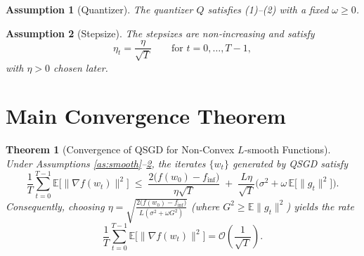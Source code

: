 \documentclass{article}
\newtheorem{theorem}{Theorem}
\newtheorem{assumption}{Assumption}
\newcommand{\EE}{\mathbb{E}}
\begin{document}
\begin{assumption}[Quantizer]\label{as:quant}
The quantizer $Q$ satisfies (1)–(2) with a fixed $\omega\ge0$. 
\end{assumption}

\begin{assumption}[Stepsize]\label{as:stepsize}
The stepsizes are non‑increasing and satisfy 
\[
\eta_t=\frac{\eta}{\sqrt{T}}\qquad\text{for }t=0,\dots,T-1,
\]
with $\eta>0$ chosen later. 
\end{assumption}

\section*{Main Convergence Theorem}
\begin{theorem}[Convergence of QSGD for Non‑Convex $L$‑smooth Functions]\label{thm:main}
Under Assumptions \ref{as:smooth}–\ref{as:stepsize}, the iterates $\{w_t\}$ generated by QSGD satisfy
\[
\frac{1}{T}\sum_{t=0}^{T-1}\EE\!\big[\|\nabla f(w_t)\|^{2}\big]
\;\le\;
\frac{2\big(f(w_0)-f_{\inf}\big)}{\eta\sqrt{T}}
\;+\;
\frac{L\eta}{\sqrt{T}}\big(\sigma^{2}+\omega\,\EE\!\big[\|g_t\|^{2}\big]\big).
\tag{4}
\]
Consequently, choosing $\eta = \sqrt{\frac{2\big(f(w_0)-f_{\inf}\big)}{L(\sigma^{2}+\omega G^{2})}}$ (where $G^{2}\ge\EE\|g_t\|^{2}$) yields the rate
\[
\frac{1}{T}\sum_{t=0}^{T-1}\EE\!\big[\|\nabla f(w_t)\|^{2}\big]=\mathcal{O}\!\left(\frac{1}{\sqrt{T}}\right).
\]
\end{theorem}

\end{document}
